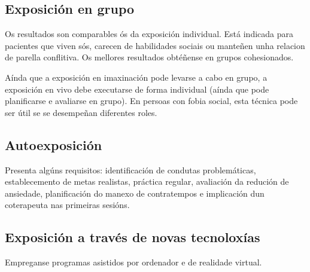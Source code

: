\documentclass[a4paper,11pt]{article}
\begin{document}
\subsection{Exposición en grupo}
Os resultados son comparables ós da exposición individual. Está indicada para pacientes que viven sós, carecen de habilidades sociais ou manteñen unha relacion de parella conflitiva. Os mellores resultados obtéñense en grupos cohesionados.

Aínda que a exposición en imaxinación pode levarse a cabo en grupo, a exposición en vivo debe executarse de forma individual (aínda que pode planificarse e avaliarse en grupo). En persoas con fobia social, esta técnica pode ser útil se se desempeñan diferentes roles.

\subsection{Autoexposición}
Presenta algúns requisitos: identificación de condutas problemáticas, establecemento de metas realistas, práctica regular, avaliación da redución de ansiedade, planificación do manexo de contratempos e implicación dun coterapeuta nas primeiras sesións.

\subsection{Exposición a través de novas tecnoloxías}
Empreganse programas asistidos por ordenador e de realidade virtual.
\end{document}
